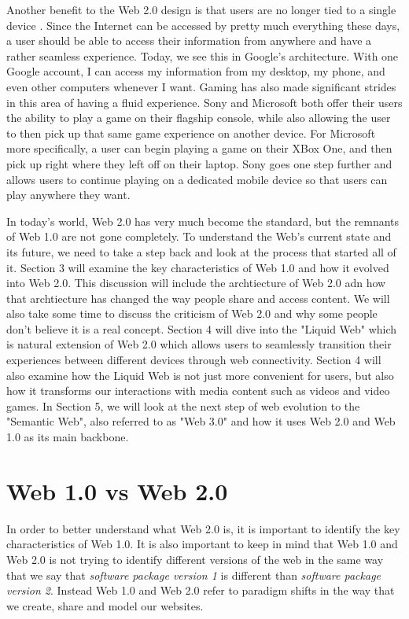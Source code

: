\documentclass[12pt]{article}
\begin{document}
Another benefit to the Web 2.0 design is that users are no longer tied to a single device \cite{what_is_web2}.  Since the Internet can be accessed by pretty much everything these days, a user should be able to access their information from anywhere and have a rather seamless experience.  Today, we see this in Google's architecture.  With one Google account, I can access my information from my desktop, my phone, and even other computers whenever I want.  Gaming has also made significant strides in this area of having a fluid experience.  Sony and Microsoft both offer their users the ability to play a game on their flagship console, while also allowing the user to then pick up that same game experience on another device.  For Microsoft more specifically, a user can begin playing a game on their XBox One, and then pick up right where they left off on their laptop.  Sony goes one step further and allows users to continue playing on a dedicated mobile device so that users can play anywhere they want.

In today's world, Web 2.0 has very much become the standard, but the remnants of Web 1.0 are not gone completely.  To understand the Web's current state and its future, we need to take a step back and look at the process that started all of it.  Section 3 will examine the key characteristics of Web 1.0 and how it evolved into Web 2.0.  This discussion will include the archtiecture of Web 2.0  adn how that archtiecture has changed the way people share and access content.  We will also take some time to discuss the criticism of Web 2.0 and why some people don't believe it is a real concept.  Section 4 will dive into the "Liquid Web" which is natural extension of Web 2.0 which allows users to seamlessly transition their experiences between different devices through web connectivity.  Section 4 will also examine how the Liquid Web is not just more convenient for users, but also how it transforms our interactions with media content such as videos and video games. In Section 5, we will look at the next step of web evolution to the "Semantic Web", also referred to as "Web 3.0" and how it uses Web 2.0 and Web 1.0 as its main backbone.

\section{Web 1.0 vs Web 2.0}
In order to better understand what Web 2.0 is, it is important to identify the key characteristics of Web 1.0.  It is also important to keep in mind that Web 1.0 and Web 2.0 is not trying to identify different versions of the web in the same way that we say that \textit{software package version 1} is different than \textit{software package version 2}.  Instead Web 1.0 and Web 2.0 refer to paradigm shifts in the way that we create, share and model our websites.
\end{document}
